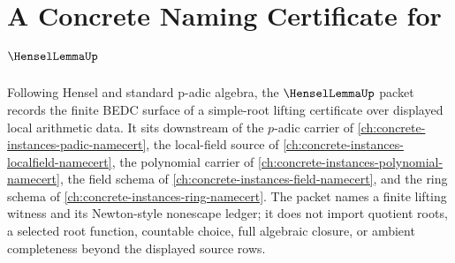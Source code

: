 \chapter{A Concrete Naming Certificate for $\HenselLemmaUp$}
\label{ch:concrete-instances-hensel-lemma-namecert}

Following Hensel and standard p-adic algebra, the $\HenselLemmaUp$ packet records the finite BEDC surface of a simple-root lifting certificate over displayed local arithmetic data. It sits downstream of the $p$-adic carrier of \autoref{ch:concrete-instances-padic-namecert}, the local-field source of \autoref{ch:concrete-instances-localfield-namecert}, the polynomial carrier of \autoref{ch:concrete-instances-polynomial-namecert}, the field schema of \autoref{ch:concrete-instances-field-namecert}, and the ring schema of \autoref{ch:concrete-instances-ring-namecert}. The packet names a finite lifting witness and its Newton-style nonescape ledger; it does not import quotient roots, a selected root function, countable choice, full algebraic closure, or ambient completeness beyond the displayed source rows.

